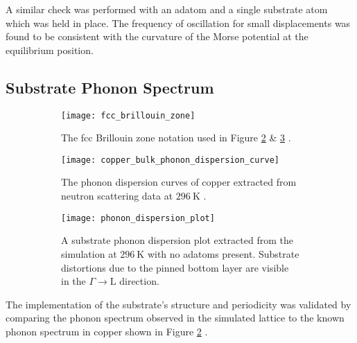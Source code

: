 A similar check was performed with an adatom and a single substrate atom which was held in place. The frequency of oscillation for small displacements was found to be consistent with the curvature of the Morse potential at the equilibrium position.

\subsection{Substrate Phonon Spectrum} \label{sec:phonon_spectrum}

\begin{figure}
	\centering
	\begin{subfigure}[t]{0.32\textwidth}
		\texttt{[image: fcc\_brillouin\_zone]}
		\caption{The fcc Brillouin zone notation used in Figure \ref{fig:experimential_phonon_dispersion_plot} \& \ref{fig:phonon_dispersion_plot} \cite{Zaleski}.}
		\label{fig:fcc_notation}
	\end{subfigure}
	\hfill
	\begin{subfigure}[t]{0.63\textwidth}
		\texttt{[image: copper\_bulk\_phonon\_dispersion\_curve]}
		\caption{The phonon dispersion curves of copper extracted from neutron scattering data at $\SI{296}{\kelvin}$ \cite{Svensson}.}
		\label{fig:experimential_phonon_dispersion_plot}
	\end{subfigure}
	\begin{subfigure}[t]{1.0\textwidth}
		\texttt{[image: phonon\_dispersion\_plot]}
		\caption{A substrate phonon dispersion plot extracted from the simulation at $\SI{296}{\kelvin}$ with no adatoms present. Substrate distortions due to the pinned bottom layer are visible in the $\Gamma\rightarrow \mathrm{L}$ direction.}
		\label{fig:phonon_dispersion_plot}
	\end{subfigure}
	\caption{}
	\label{fig:phonons}
\end{figure}

The implementation of the substrate's structure and periodicity was validated by comparing the phonon spectrum observed in the simulated lattice to the known phonon spectrum in copper shown in Figure \ref{fig:experimential_phonon_dispersion_plot} \cite{sinha}. 

